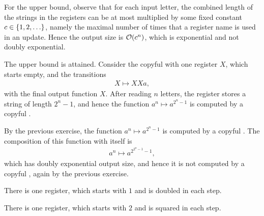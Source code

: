    {
For the upper bound, observe that for each input letter, the combined length of the strings in the registers can be at most multiplied by some fixed constant $c \in \{1,2,\ldots\}$, namely the maximal number of times that a register name is used in an update. Hence the output size is ${\mathcal O}(c^n)$, which is exponential and not doubly exponential.

The upper bound is attained. Consider the copyful \sst with one register $X$, which starts empty, and the transitions
\begin{align*}
X \mapsto XXa,
\end{align*}
with the final output function $X$. After reading $n$ letters, the register stores a string of length $2^n - 1$, and hence the function $a^n \mapsto a^{2^n-1}$ is computed by a copyful \sst.
}

   {
By the previous exercise, the function $a^n \mapsto a^{2^n-1}$ is computed by a copyful \sst. The composition of this function with itself is
\begin{align*}
a^n \mapsto a^{2^{2^n-1}-1},
\end{align*}
which has doubly exponential output size, and hence it is not computed by a copyful \sst, again by the previous exercise.
}

   { There is one register, which starts with $1$ and is doubled in each step. }

     { There is one register, which starts with $2$ and is squared in each step. }


